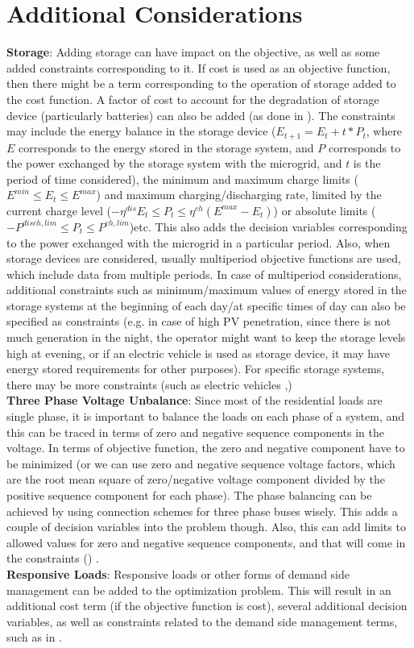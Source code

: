 \section{Additional Considerations}
\textbf{Storage}: Adding storage can have impact on the objective, as well as some added constraints corresponding to it. If cost is used as an objective function, then there might be a term corresponding to the operation of storage added to the cost function. A factor of cost to account for the degradation of storage device (particularly batteries) can also be added (as done in \citep{mgrj49}). The constraints may include the energy balance in the storage device ($E_{t+1} = E_t + t*P_t$, where $E$ corresponds to the energy stored in the storage system, and $P$ corresponds to the power exchanged by the storage system with the microgrid, and $t$ is the period of time considered), the minimum and maximum charge limits ($E^{min}\le E_t\le E^{max}$) and maximum charging/discharging rate, limited by the current charge level ($-\eta^{dis}E_t\le P_t\le \eta^{ch}\left(E^{max}-E_t\right)$)  or absolute limits ($-P^{disch,lim}\le P_t\le P^{ch,lim}$)etc. This also adds the decision variables corresponding to the power exchanged with the microgrid in a particular period. Also, when storage devices are considered, usually multiperiod objective functions are used, which include data from multiple periods. In case of multiperiod considerations, additional constraints such as minimum/maximum values of energy stored in the storage systems at the beginning of each day/at specific times of day can also be specified as constraints (e.g. in case of high PV penetration, since there is not much generation in the night, the operator might want to keep the storage levels high at evening, or if an electric vehicle is used as storage device, it may have energy stored requirements for other purposes). For specific storage systems, there may be more constraints (such as electric vehicles \citep{mgrj49},\citep{mgrj29})\\
\textbf{Three Phase Voltage Unbalance}: Since most of the residential loads are single phase, it is important to balance the loads on each phase of a system, and this can be traced in terms of zero and negative sequence components in the voltage. In terms of objective function, the zero and negative component have to be minimized (or we can use zero and negative sequence voltage factors, which are the root mean square of zero/negative voltage component divided by the positive sequence component for each phase). The phase balancing can be achieved by using connection schemes for three phase buses wisely. This adds a couple of decision variables into the problem though. Also, this can add limits to allowed values for zero and negative sequence components, and that will come in the constraints (\citep{mgrj51}) .\\
\textbf{Responsive Loads}: Responsive loads or other forms of demand side management can be added to the optimization problem. This will result in an additional cost term (if the objective function is cost), several additional decision variables, as well as constraints related to the demand side management terms, such as in \citep{mgrj29}.\\
